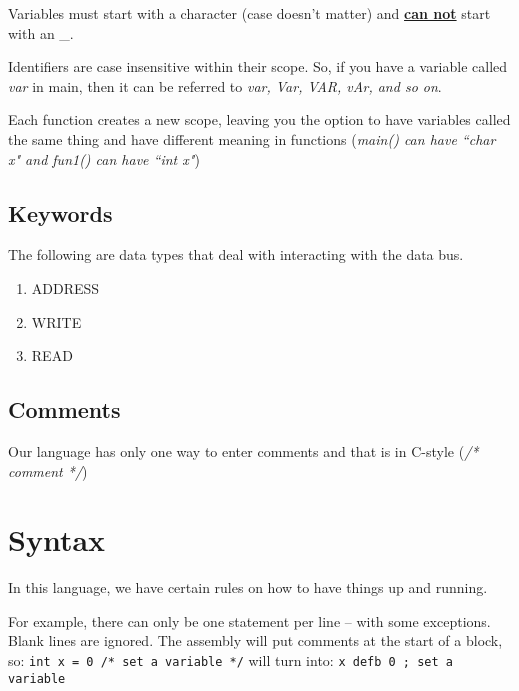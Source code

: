\documentclass[letterpaper, 12pt]{article}
\begin{document}
Variables must start with a character (case doesn't matter) and
\textbf{\underline{can not}} start with an \_.

Identifiers are case insensitive within their scope. So, if you have a variable
called \textit{var} in main, then it can be referred to \textit{var, Var, VAR,
  vAr, and so on}.

Each function creates a new scope, leaving you the option to have variables
called the same thing and have different meaning in functions (\textit{main() can
    have ``char x" and fun1() can have ``int x"}) 
\subsection{Keywords}
The following are data types that deal with interacting with the data bus.
\begin{enumerate}
\item ADDRESS
\item WRITE
\item READ
\end{enumerate}
\subsection{Comments}
Our language has only one way to enter comments and that is in C-style
(\textit{/* comment */})
\section{Syntax}
In this language, we have certain rules on how to have things up and running.

For example, there can only be one statement per line -- with some exceptions.
Blank lines are ignored. The assembly will put comments at the start of a block,
so:
\newline
\texttt{int x = 0 /* set a variable */}
will turn into:
\newline
\newline
\texttt{x defb 0 ; set a variable }
\end{document}
